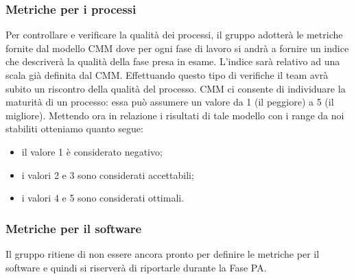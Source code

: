 \documentclass[../PianoDiQualifica.tex]{subfiles}
\begin{document}
			\subsubsection{Metriche per i processi}
			Per controllare e verificare la qualità dei processi, il gruppo adotterà le metriche fornite dal
			modello CMM dove per ogni fase di lavoro si andrà a fornire un indice che descriverà la
			qualità della fase presa in esame. L'indice sarà relativo ad una scala già definita dal CMM.
			Effettuando questo tipo di verifiche il team avrà subito un riscontro della qualità del processo. CMM ci consente di individuare la maturità di un processo: essa può assumere un valore da 1 (il
			peggiore) a 5 (il migliore). Mettendo ora in relazione i risultati di tale modello con i range da noi
			stabiliti otteniamo quanto segue:
			\begin{itemize}
			\item il valore 1 è considerato negativo;
			\item i valori 2 e 3 sono considerati accettabili;
			\item i valori 4 e 5 sono considerati ottimali.
			\end{itemize}
			\subsubsection{Metriche per il software}
			Il gruppo ritiene di non essere ancora pronto per definire le metriche per il software e quindi si riserverà di riportarle durante la Fase PA.
\end{document}
